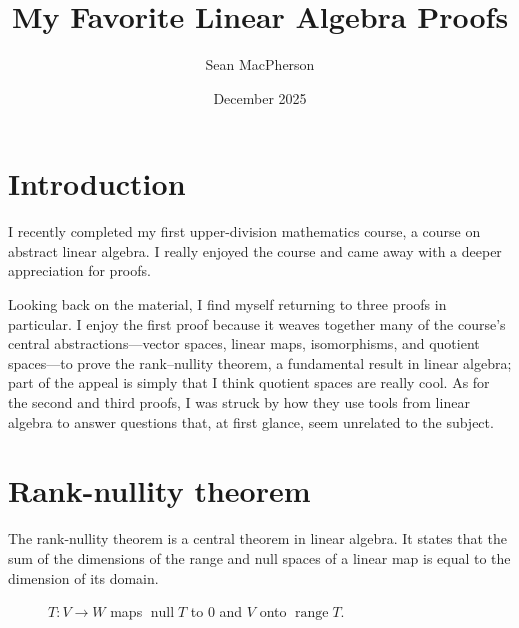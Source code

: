 \documentclass{article}
\title{My Favorite Linear Algebra Proofs}
\author{Sean MacPherson}
\date{December 2025}
\numberwithin{equation}{section}
\begin{document}
\maketitle

\section{Introduction}
I recently completed my first upper-division mathematics course, a course on abstract linear algebra. I really enjoyed the course and came away with a deeper appreciation for proofs.

Looking back on the material, I find myself returning to three proofs in particular. I enjoy the first proof because it weaves together many of the course’s central abstractions—vector spaces, linear maps, isomorphisms, and quotient spaces—to prove the rank–nullity theorem, a fundamental result in linear algebra; part of the appeal is simply that I think quotient spaces are really cool. As for the second and third proofs, I was struck by how they use tools from linear algebra to answer questions that, at first glance, seem unrelated to the subject.

\section{Rank-nullity theorem}
The rank-nullity theorem is a central theorem in linear algebra. It states that the sum of the dimensions of the range and null spaces of a linear map is equal to the dimension of its domain.

\begin{figure}[h]
\centering
{}
\caption{$T: V \to W$ maps $\operatorname{null}T$ to 0 and $V$ onto $\operatorname{range} T.$}
\end{figure}
\end{document}

